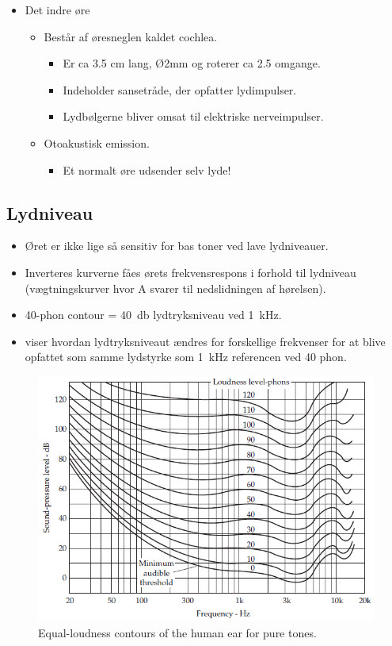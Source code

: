 \begin{itemize}
	\item Det indre øre
	\begin{itemize}
		\item Består af øresneglen kaldet cochlea.
		\begin{itemize}
			\item Er ca 3.5 cm lang, Ø2mm og roterer ca 2.5 omgange.
			\item Indeholder sansetråde, der opfatter lydimpulser. 
			\item Lydbølgerne bliver omsat til elektriske nerveimpulser. 
		\end{itemize}
		\item Otoakustisk emission.
		\begin{itemize}
			\item Et normalt øre udsender selv lyde!
		\end{itemize}
	\end{itemize}
\end{itemize}

\subsection{Lydniveau}
\begin{itemize}
	\item Øret er ikke lige så sensitiv for bas toner ved lave lydniveauer.
	\item Inverteres kurverne fåes ørets frekvensrespons i forhold til lydniveau (vægtningskurver hvor A svarer til nedslidningen af hørelsen).
	\item 40-phon contour = \SI{40}{\decibel} lydtryksniveau ved \SI{1}{\kilo\hertz}.
	\item {} viser hvordan lydtryksniveaut ændres for forskellige frekvenser for at blive opfattet som samme lydstyrke som \SI{1}{\kilo\hertz} referencen ved 40 phon.
\end{itemize}

\begin{figure} [H]
	\centering
	\includegraphics[width=\linewidth]{graphics/42.png}
	\caption{Equal-loudness contours of the human ear for pure tones.}
	\label{fig:42}
\end{figure}

